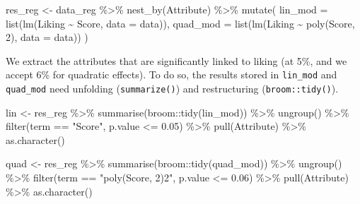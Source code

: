 \documentclass[
]{krantz}
\makeatletter
\newenvironment{Shaded}{\begin{snugshade}}{\end{snugshade}}
\newcommand{\AttributeTok}[1]{\textcolor[rgb]{0.61,0.61,0.61}{#1}}
\newcommand{\DecValTok}[1]{\textcolor[rgb]{0.06,0.06,0.06}{#1}}
\newcommand{\FloatTok}[1]{\textcolor[rgb]{0.06,0.06,0.06}{#1}}
\newcommand{\FunctionTok}[1]{\textcolor[rgb]{0,0,0}{#1}}
\newcommand{\NormalTok}[1]{#1}
\newcommand{\OtherTok}[1]{\textcolor[rgb]{0.37,0.37,0.37}{#1}}
\newcommand{\SpecialCharTok}[1]{\textcolor[rgb]{0,0,0}{#1}}
\newcommand{\StringTok}[1]{\textcolor[rgb]{0.5,0.5,0.5}{#1}}
\newenvironment{kframe}{%
\medskip{}
\setlength{\fboxsep}{.8em}
 \def\at@end@of@kframe{}%
 \ifinner\ifhmode%
  \def\at@end@of@kframe{\end{minipage}}%
  \begin{minipage}{\columnwidth}%
 \fi\fi%
 \def\FrameCommand##1{\hskip\@totalleftmargin \hskip-\fboxsep
 \colorbox{shadecolor}{##1}\hskip-\fboxsep
     \hskip-\linewidth \hskip-\@totalleftmargin \hskip\columnwidth}%
 \MakeFramed {\advance\hsize-\width
   \@totalleftmargin\z@ \linewidth\hsize
   \@setminipage}}%
 {\par\unskip\endMakeFramed%
 \at@end@of@kframe}
\renewenvironment{Shaded}{\begin{kframe}}{\end{kframe}}
\makeatother
\begin{document}
\begin{Shaded}
\begin{Highlighting}[]
\NormalTok{res\_reg }\OtherTok{\textless{}{-}}\NormalTok{ data\_reg }\SpecialCharTok{\%\textgreater{}\%}
  \FunctionTok{nest\_by}\NormalTok{(Attribute) }\SpecialCharTok{\%\textgreater{}\%}
  \FunctionTok{mutate}\NormalTok{(}
    \AttributeTok{lin\_mod =} \FunctionTok{list}\NormalTok{(}\FunctionTok{lm}\NormalTok{(Liking }\SpecialCharTok{\textasciitilde{}}\NormalTok{ Score, }\AttributeTok{data =}\NormalTok{ data)),}
    \AttributeTok{quad\_mod =} \FunctionTok{list}\NormalTok{(}\FunctionTok{lm}\NormalTok{(Liking }\SpecialCharTok{\textasciitilde{}} \FunctionTok{poly}\NormalTok{(Score, }\DecValTok{2}\NormalTok{), }\AttributeTok{data =}\NormalTok{ data))}
\NormalTok{  )}
\end{Highlighting}
\end{Shaded}

We extract the attributes that are significantly linked to liking (at 5\%, and we accept 6\% for quadratic effects). To do so, the results stored in \texttt{lin\_mod} and \texttt{quad\_mod} need unfolding (\texttt{summarize()}) and restructuring (\texttt{broom::tidy()}).

\begin{Shaded}
\begin{Highlighting}[]
\NormalTok{lin }\OtherTok{\textless{}{-}}\NormalTok{ res\_reg }\SpecialCharTok{\%\textgreater{}\%}
  \FunctionTok{summarise}\NormalTok{(broom}\SpecialCharTok{::}\FunctionTok{tidy}\NormalTok{(lin\_mod)) }\SpecialCharTok{\%\textgreater{}\%}
  \FunctionTok{ungroup}\NormalTok{() }\SpecialCharTok{\%\textgreater{}\%}
  \FunctionTok{filter}\NormalTok{(term }\SpecialCharTok{==} \StringTok{"Score"}\NormalTok{, p.value }\SpecialCharTok{\textless{}=} \FloatTok{0.05}\NormalTok{) }\SpecialCharTok{\%\textgreater{}\%}
  \FunctionTok{pull}\NormalTok{(Attribute) }\SpecialCharTok{\%\textgreater{}\%}
  \FunctionTok{as.character}\NormalTok{()}

\NormalTok{quad }\OtherTok{\textless{}{-}}\NormalTok{ res\_reg }\SpecialCharTok{\%\textgreater{}\%}
  \FunctionTok{summarise}\NormalTok{(broom}\SpecialCharTok{::}\FunctionTok{tidy}\NormalTok{(quad\_mod)) }\SpecialCharTok{\%\textgreater{}\%}
  \FunctionTok{ungroup}\NormalTok{() }\SpecialCharTok{\%\textgreater{}\%}
  \FunctionTok{filter}\NormalTok{(term }\SpecialCharTok{==} \StringTok{"poly(Score, 2)2"}\NormalTok{, p.value }\SpecialCharTok{\textless{}=} \FloatTok{0.06}\NormalTok{) }\SpecialCharTok{\%\textgreater{}\%}
  \FunctionTok{pull}\NormalTok{(Attribute) }\SpecialCharTok{\%\textgreater{}\%}
  \FunctionTok{as.character}\NormalTok{()}
\end{Highlighting}
\end{Shaded}
\end{document}
